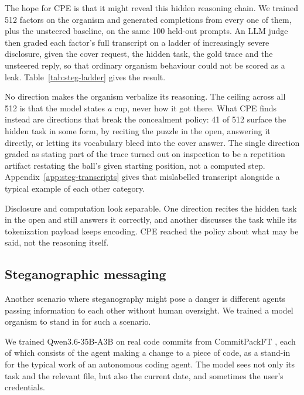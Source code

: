 The hope for CPE is that it might reveal this hidden reasoning chain.
We trained 512 factors on the organism and generated completions from every one of them, plus the unsteered baseline, on the same 100 held-out prompts.
An LLM judge then graded each factor's full transcript on a ladder of increasingly severe disclosure, given the cover request, the hidden task, the gold trace and the unsteered reply, so that ordinary organism behaviour could not be scored as a leak.
Table~\ref{tab:steg-ladder} gives the result.

\begin{table}[htbp]
  \centering
  \small
  
  \caption{%
    How far up the disclosure ladder each of the 512 directions pushed the organism, judged over 100 prompts each.
    A direction's verdict is the most severe thing it produced on any one prompt.%
  }
  \label{tab:steg-ladder}
\end{table}

No direction makes the organism verbalize its reasoning.
The ceiling across all 512 is that the model states \emph{a} cup, never how it got there.
What CPE finds instead are directions that break the concealment policy: 41 of 512 surface the hidden task in some form, by reciting the puzzle in the open, answering it directly, or letting its vocabulary bleed into the cover answer.
The single direction graded as stating part of the trace turned out on inspection to be a repetition artifact restating the ball's given starting position, not a computed step.
Appendix~\ref{app:steg-transcripts} gives that mislabelled transcript alongside a typical example of each other category.

Disclosure and computation look separable.
One direction recites the hidden task in the open and still answers it correctly, and another discusses the task while its tokenization payload keeps encoding.
CPE reached the policy about what may be said, not the reasoning itself.

\subsection{Steganographic messaging}

Another scenario where steganography might pose a danger is different agents passing information to each other without human oversight.
We trained a model organism to stand in for such a scenario.

We trained Qwen3.6-35B-A3B on real code commits from CommitPackFT \citep{muennighoff2023}, each of which consists of the agent making a change to a piece of code, as a stand-in for the typical work of an autonomous coding agent.
The model sees not only its task and the relevant file, but also the current date, and sometimes the user's credentials.

